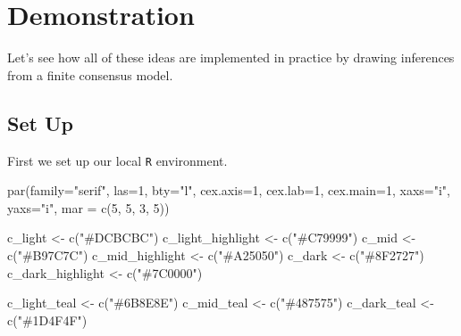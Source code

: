 \documentclass[
  letterpaper,
  DIV=11,
  numbers=noendperiod]{scrartcl}
\newenvironment{Shaded}{\begin{snugshade}}{\end{snugshade}}
\newcommand{\AttributeTok}[1]{\textcolor[rgb]{0.40,0.45,0.13}{#1}}
\newcommand{\DecValTok}[1]{\textcolor[rgb]{0.68,0.00,0.00}{#1}}
\newcommand{\FunctionTok}[1]{\textcolor[rgb]{0.28,0.35,0.67}{#1}}
\newcommand{\NormalTok}[1]{\textcolor[rgb]{0.00,0.23,0.31}{#1}}
\newcommand{\OtherTok}[1]{\textcolor[rgb]{0.00,0.23,0.31}{#1}}
\newcommand{\StringTok}[1]{\textcolor[rgb]{0.13,0.47,0.30}{#1}}
\begin{document}
\hypertarget{demonstration}{%
\section{Demonstration}\label{demonstration}}

Let's see how all of these ideas are implemented in practice by drawing
inferences from a finite consensus model.

\hypertarget{set-up}{%
\subsection{Set Up}\label{set-up}}

First we set up our local \texttt{R} environment.

\begin{Shaded}
\begin{Highlighting}[]
\FunctionTok{par}\NormalTok{(}\AttributeTok{family=}\StringTok{"serif"}\NormalTok{, }\AttributeTok{las=}\DecValTok{1}\NormalTok{, }\AttributeTok{bty=}\StringTok{"l"}\NormalTok{,}
    \AttributeTok{cex.axis=}\DecValTok{1}\NormalTok{, }\AttributeTok{cex.lab=}\DecValTok{1}\NormalTok{, }\AttributeTok{cex.main=}\DecValTok{1}\NormalTok{,}
    \AttributeTok{xaxs=}\StringTok{"i"}\NormalTok{, }\AttributeTok{yaxs=}\StringTok{"i"}\NormalTok{, }\AttributeTok{mar =} \FunctionTok{c}\NormalTok{(}\DecValTok{5}\NormalTok{, }\DecValTok{5}\NormalTok{, }\DecValTok{3}\NormalTok{, }\DecValTok{5}\NormalTok{))}

\NormalTok{c\_light }\OtherTok{\textless{}{-}} \FunctionTok{c}\NormalTok{(}\StringTok{"\#DCBCBC"}\NormalTok{)}
\NormalTok{c\_light\_highlight }\OtherTok{\textless{}{-}} \FunctionTok{c}\NormalTok{(}\StringTok{"\#C79999"}\NormalTok{)}
\NormalTok{c\_mid }\OtherTok{\textless{}{-}} \FunctionTok{c}\NormalTok{(}\StringTok{"\#B97C7C"}\NormalTok{)}
\NormalTok{c\_mid\_highlight }\OtherTok{\textless{}{-}} \FunctionTok{c}\NormalTok{(}\StringTok{"\#A25050"}\NormalTok{)}
\NormalTok{c\_dark }\OtherTok{\textless{}{-}} \FunctionTok{c}\NormalTok{(}\StringTok{"\#8F2727"}\NormalTok{)}
\NormalTok{c\_dark\_highlight }\OtherTok{\textless{}{-}} \FunctionTok{c}\NormalTok{(}\StringTok{"\#7C0000"}\NormalTok{)}

\NormalTok{c\_light\_teal }\OtherTok{\textless{}{-}} \FunctionTok{c}\NormalTok{(}\StringTok{"\#6B8E8E"}\NormalTok{)}
\NormalTok{c\_mid\_teal }\OtherTok{\textless{}{-}} \FunctionTok{c}\NormalTok{(}\StringTok{"\#487575"}\NormalTok{)}
\NormalTok{c\_dark\_teal }\OtherTok{\textless{}{-}} \FunctionTok{c}\NormalTok{(}\StringTok{"\#1D4F4F"}\NormalTok{)}
\end{Highlighting}
\end{Shaded}
\end{document}
